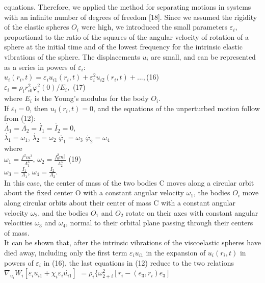 \documentclass[fontsize = 11pt,a4paper]{article}
\begin{document}
\begin{multicols}{2}
equations. Therefore, we applied the method
for separating motions in systems with an infinite
number of degrees of freedom [18]. Since we assumed
the rigidity of the elastic spheres $O_i$ were high, we
introduced the small parameters $\varepsilon_i$, proportional to
the ratio of the squares of the angular velocity of
rotation of a sphere at the initial time and of the lowest
frequency for the intrinsic elastic vibrations of the
sphere. The displacements $u_i$ are small, and can be
represented as a series in powers of $\varepsilon_i$:\\
$u_i(r_i,t) = \varepsilon_i u_{i1}(r_i,t) +  \varepsilon_i^2 u_{i2}(r_i,t) + ...,$\hfill (16) \\
$\varepsilon_i = \rho_i r^2_{i0} \varphi^2_i(0) / E_i,$ \hfill (17) \\
where $E_i$ is the Young’s modulus for the body $O_i$.\\
If $\varepsilon_i  = 0$, then $u_i(r_i, t) = 0$, and the equations of
the unperturbed motion follow from (12):\\
$\dot{\Lambda_1} = \dot{\Lambda_2} = \dot{I_1} = \dot{I_2} = 0,$\\
$\dot{\lambda_1} = \omega_1$,   $\dot{\lambda_2} = \omega_2$  $\dot{\varphi_1} = \omega_3$  $\dot{\varphi_2} = \omega_4$\\
where \\
$\omega_1 = \frac{f^2m^3}{\Lambda^3_1}$,    $\omega_2 = \frac{f^2_0 m^3_r}{\Lambda^3_2}$ \hfill (19)\\
$\omega_3 = \frac{I_1}{A_1}$,  $\omega_4 = \frac{I_2}{A_2}$.\\
In this case, the center of mass of the two bodies C
moves along a circular orbit about the fixed center
O with a constant angular velocity $\omega_1$, the bodies
$O_i$ move along circular orbits about their center of
mass C with a constant angular velocity $\omega_2$, and the
bodies $O_1$ and $O_2$ rotate on their axes with constant
angular velocities $\omega_3$ and $\omega_4$, normal to their orbital
plane passing through their centers of mass. \\
\indent It can be shown that, after the intrinsic vibrations
of the viscoelastic spheres have died away, including
only the first term $\varepsilon_i u_{i1}$ in the expansion of $u_i(r_i, t)$ in
powers of $\varepsilon_i$ in (16), the last equations in (12) reduce
to the two relations\\
$\nabla_{u_i}W_i[\varepsilon_i u_{i1} + \chi_i \varepsilon_i \dot{u_{i1}}]$
$ = \rho_i \{ \omega^2_{2+i} [ r_i - (e_3,r_i)e_3]$\\

\end{multicols}
\end{document}
